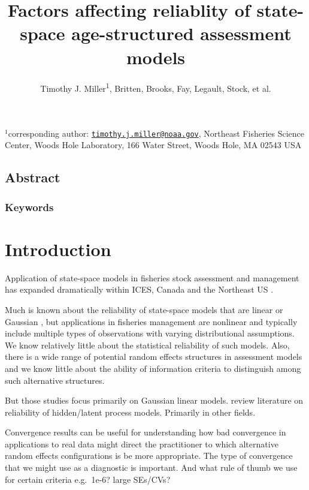 \documentclass[
  12pt,
]{article}
\title{Factors affecting reliablity of state-space age-structured
assessment models}
\author{Timothy J. Miller\textsuperscript{1}, Britten, Brooks, Fay,
Legault, Stock, et al.}
\date{}
\begin{document}
\maketitle

\(^1\)corresponding author:
\href{mailto:timothy.j.miller@noaa.gov}{\nolinkurl{timothy.j.miller@noaa.gov}},
Northeast Fisheries Science Center, Woods Hole Laboratory, 166 Water
Street, Woods Hole, MA 02543 USA\\

\pagebreak

\hypertarget{abstract}{%
\subsection*{Abstract}\label{abstract}}

\hypertarget{keywords}{%
\subsubsection*{Keywords}\label{keywords}}

\pagebreak

\hypertarget{introduction}{%
\section{Introduction}\label{introduction}}

Application of state-space models in fisheries stock assessment and
management has expanded dramatically within ICES, Canada and the
Northeast US \citep{nielsenberg14,cadigan16,stockmiller21}.

Much is known about the reliability of state-space models that are
linear or Gaussian \citep{aeberhardetal18}, but applications in
fisheries management are nonlinear and typically include multiple types
of observations with varying distributional assumptions. We know
relatively little about the statistical reliability of such models.
Also, there is a wide range of potential random effects structures in
assessment models and we know little about the ability of information
criteria to distinguish among such alternative structures.

But those studies focus primarily on Gaussian linear models. review
literature on reliability of hidden/latent process models. Primarily in
other fields.

Convergence results can be useful for understanding how bad convergence
in applications to real data might direct the practitioner to which
alternative random effects configurations is be more appropriate. The
type of convergence that we might use as a diagnostic is important. And
what rule of thumb we use for certain criteria e.g.~1e-6? large SEs/CVs?
\end{document}
